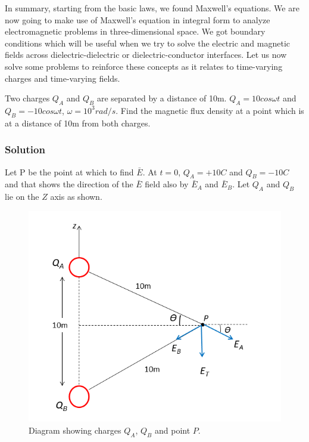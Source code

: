 In summary, starting from the basic laws, we found Maxwell's equations. We are now going to make use of Maxwell's equation in integral form to analyze electromagnetic problems in three-dimensional space. We got boundary conditions which will be useful when we try to solve the electric and magnetic fields across dielectric-dielectric or dielectric-conductor interfaces. Let us now solve some problems to reinforce these concepts as it relates to time-varying charges and time-varying fields.
\begin{exmp}
Two charges $Q_A$ and $Q_B$ are separated by a distance of 10m. $Q_A = 10cos\omega t$ and $Q_B = -10cos\omega t$, $\omega = 10^3 rad/s$. Find the magnetic flux density at a point which is at a distance of 10m from both charges.

\subsubsection*{Solution}
Let P be the point at which to find $\bar{E}$. At $t = 0$, $Q_A = +10C$ and $Q_B = -10C$ and that shows the direction of the $\bar{E}$ field also by $\bar{E}_{A}$ and $\bar{E}_{B}$. Let $Q_A$ and $Q_B$ lie on the $Z$ axis as shown.
\begin{figure}[h]
\centering
\includegraphics[width=1\linewidth]{graphics/fig20.10}
\caption{Diagram showing charges $Q_A$, $Q_B$ and point $P$.}
\end{figure}


\end{exmp}
